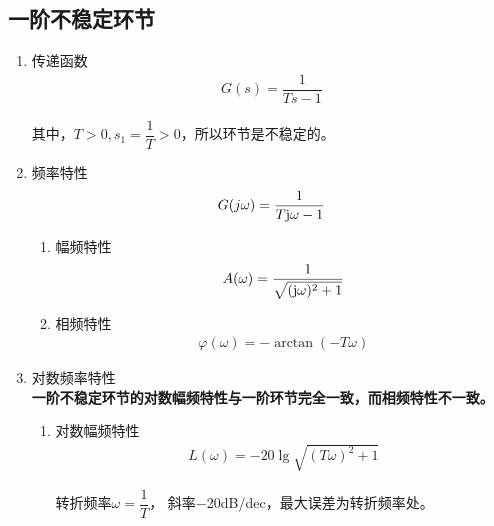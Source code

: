 \subsection{一阶不稳定环节}
\begin{enumerate}[1.]
	\item 传递函数
	\vspace*{-0.5em}
	\begin{align}
		G(s) =  \dfrac{1}{Ts - 1}
	\end{align}
	\vspace*{-2em}
	
	其中，$T>0,s_1 = \dfrac{1}{T} > 0$，所以环节是不稳定的。
	
	\item 频率特性
	\vspace*{-0.5em}
	\begin{align}
		G(j\omega) = \dfrac{1}{T \text{j} \omega - 1}
	\end{align}
	\vspace*{-3em}
	\begin{enumerate}[(1) ]
		\item 幅频特性
		\vspace*{-0.5em}
		\begin{align}
			A(\omega) = \dfrac{1}{\sqrt{(\text{j} \omega)^2 + 1}}
		\end{align}
		\vspace*{-3em}
		
		\item 相频特性
		\vspace*{-0.5em}
		\begin{align}
			\varphi(\omega) = - \arctan(- T \omega)
		\end{align}
		\vspace*{-3em}
	\end{enumerate}
	\item 对数频率特性\\
	\textbf{一阶不稳定环节的对数幅频特性与一阶环节完全一致，而相频特性不一致。}
	\vspace*{-0.5em}
	\begin{enumerate}[(1) ]
		\item 对数幅频特性
		\vspace*{-0.5em}
		\begin{align}
			L(\omega) = - 20 \lg \sqrt{(T\omega)^2 + 1}
		\end{align}
		\vspace*{-2em}
		
		转折频率$\omega = \dfrac{1}{T}$， 斜率$-$20dB/dec，最大误差为转折频率处。
		

\end{enumerate}
\end{enumerate}
